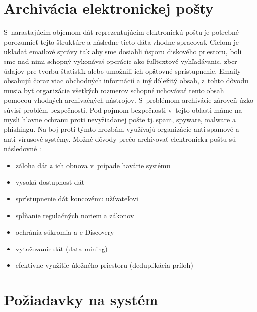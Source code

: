 \documentclass[11pt,twoside,a4paper]{book}
\begin{document}

\section{Archivácia elektronickej pošty}


S~narastajúcim objemom dát reprezentujúcim elektronickú poštu je potrebné porozumieť tejto štruktúre a následne tieto dáta vhodne spracovať. Cieľom je ukladať emailové správy tak aby sme dosiahli úsporu diskového priestoru, boli sme nad nimi schopný vykonávať operácie ako fulltextové vyhľadávanie, zber údajov pre tvorbu štatistík alebo umožnili ich opätovné sprístupnenie. Emaily obsahujú čoraz viac obchodných informácií a iný dôležitý obsah, z~tohto dôvodu musia byť organizácie všetkých rozmerov schopné uchovávať tento obsah pomocou vhodných archivačných nástrojov. S~problémom archivácie zároveň úzko súvisí problém bezpečnosti. Pod pojmom bezpečnosti v~tejto oblasti máme na mysli hlavne ochranu proti nevyžiadanej pošte tj. spam, spyware, malware a phishingu. Na boj proti týmto hrozbám využívajú organizácie anti-spamové a anti-vírusové systémy. Možné dôvody prečo archivovať elektronickú poštu sú následovné \cite{WhyArchiving}:
\begin{itemize}
 \item 
  záloha dát a ich obnova v~prípade havárie systému
 \item
  vysoká dostupnosť dát
 \item
  sprístupnenie dát koncovému užívateľovi
 \item
  spĺňanie regulačných noriem a zákonov
 \item
  ochránia súkromia a e-Discovery
 \item
  vyťažovanie dát (data mining)
 \item
  efektívne využitie úložného priestoru (deduplikácia príloh)
\end{itemize}


\section{Požiadavky na systém}
\end{document}
